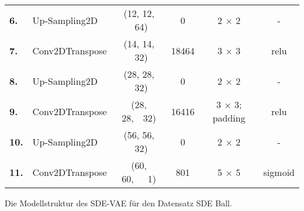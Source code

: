 \documentclass[12pt]{article}
\begin{document}
\begin{table}[htb!]
\begin{center}
\begin{tabular}{llcccc}
				\textbf{6.}	&Up-Sampling2D	& (12, 12, \ 64)	& 0		& 2 $\times$ 2 	&- \\
				\textbf{7.}	&Conv2DTranspose& (14, 14, \ 32)	& 18464		& 3 $\times$ 3 			&relu \\
				\textbf{8.}	&Up-Sampling2D	& (28, 28, \ 32)	& 0	& 2 $\times$ 2 			&- \\
				\textbf{9.}	&Conv2DTranspose& (28, 28,\ \ 32)	& 16416  	& 3 $\times$ 3; padding 			&relu \\
				\textbf{10.}&Up-Sampling2D	& (56, 56, \ 32)	& 0	& 2 $\times$ 2 			&- \\
				\textbf{11.}&Conv2DTranspose& (60, 60,\ \ \ 1)	& 801  	& 5 $\times$ 5 &sigmoid \\
				\bottomrule
				\bottomrule
			\end{tabular}
		\end{center}
	\end{table}
	\newpage
	Die Modellstruktur des SDE-VAE für den Datensatz SDE Ball.
\end{document}
